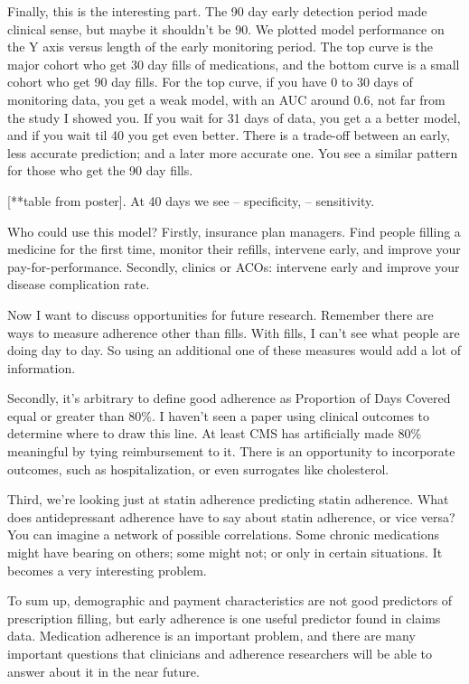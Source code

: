 \documentclass[12pt]{report}
\begin{document}
\begin{large}
Finally, this is the interesting part. The 90 day early detection
period made clinical sense, but maybe it shouldn't be 90. We plotted
model performance on the Y axis versus length of the early monitoring
period. The top curve is the major cohort who get 30 day fills of
medications, and the bottom curve is a small cohort who get 90 day
fills. For the top curve, if you have 0 to 30 days of monitoring data,
you get a weak model, with an AUC around 0.6, not far from the study I
showed you. If you wait for 31 days of data, you get a a better model,
and if you wait til 40 you get even better. There is a trade-off
between an early, less accurate prediction; and a later more accurate
one. You see a similar pattern for those who get the 90 day fills.

[**table from poster]. At 40 days we see -- specificity, --
sensitivity.

Who could use this model? Firstly, insurance plan managers. Find
people filling a medicine for the first time, monitor their refills,
intervene early, and improve your pay-for-performance. Secondly,
clinics or ACOs: intervene early and improve your disease complication
rate.

Now I want to discuss opportunities for future research. Remember
there are ways to measure adherence other than fills. With fills, I
can't see what people are doing day to day. So using an additional one
of these measures would add a lot of information.

Secondly, it's arbitrary to define good adherence as Proportion of
Days Covered equal or greater than 80\%. I haven't seen a paper using
clinical outcomes to determine where to draw this line. At least CMS
has artificially made 80\% meaningful by tying reimbursement to it.
There is an opportunity to incorporate outcomes, such as
hospitalization, or even surrogates like cholesterol.

Third, we're looking just at statin adherence predicting statin
adherence. What does antidepressant adherence have to say about statin
adherence, or vice versa? You can imagine a network of possible
correlations. Some chronic medications might have bearing on others;
some might not; or only in certain situations. It becomes a very
interesting problem.

To sum up, demographic and payment characteristics are not good
predictors of prescription filling, but early adherence is one useful
predictor found in claims data. Medication adherence is an important
problem, and there are many important questions that clinicians and
adherence researchers will be able to answer about it in the near
future.


\end{large}
\end{document}
